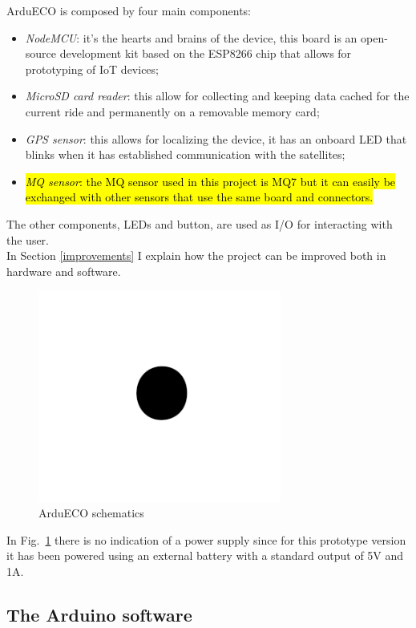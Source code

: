 \documentclass[conference]{IEEEtran}
\DeclareRobustCommand{\hlcyan}[1]{{\sethlcolor{cyan}\hl{#1}}}
\begin{document}
		ArduECO is composed by four main components:
		\begin{itemize}
			\item \textit{NodeMCU}: it's the hearts and brains of the device, this board is an open-source development kit based on the ESP8266 chip that allows for prototyping of IoT devices;
			\item \textit{MicroSD card reader}: this allow for collecting and keeping data cached for the current ride and permanently on a removable memory card;
			\item \textit{GPS sensor}: this allows for localizing the device, it has an onboard LED that blinks when it has established communication with the satellites;
			\item \hlcyan{\textit{MQ sensor}: the MQ sensor used in this project is MQ7 but it can easily be exchanged with other sensors that use the same board and connectors.}
		\end{itemize}
		The other components, LEDs and button, are used as I/O for interacting with the user.\\
		In Section \ref{improvements} I explain how the project can be improved both in hardware and software.
		\begin{figure}[htbp]
			\centerline{\includegraphics[width=8cm]{fig1.png}}
			\caption{ArduECO schematics}
			\label{schematics}
		\end{figure}
		In Fig.~\ref{schematics} there is no indication of a power supply since for this prototype version it has been powered using an external battery with a standard output of 5V and 1A.
	
	\subsection{The Arduino software}
	
\end{document}
